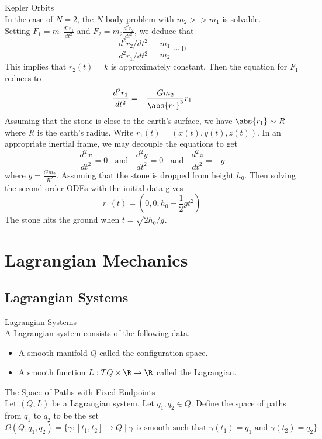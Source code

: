\documentclass[a4paper]{article}
\begin{document}
\begin{eg}{Kepler Orbits}{}\\
In the case of $N=2$, the $N$ body problem with $m_2>>m_1$ is solvable. \\

Setting $F_1=m_1\frac{d^2r_1}{dt^2}$ and $F_2=m_2\frac{d^2r_2}{dt^2}$, we deduce that $$\frac{d^2r_2/dt^2}{d^2r_1/dt^2}=\frac{m_1}{m_2}\sim 0$$ This implies that $r_2(t)=k$ is approximately constant. Then the equation for $F_1$ reduces to $$\frac{d^2r_1}{dt^2}=-\frac{Gm_2}{\abs{r_1}^3}r_1$$ Assuming that the stone is close to the earth's surface, we have $\abs{r_1}\sim R$ where $R$ is the earth's radius. Write $r_1(t)=(x(t),y(t),z(t))$. In an appropriate inertial frame, we may decouple the equations to get $$\frac{d^2x}{dt^2}=0\;\;\text{ and }\;\;\frac{d^2y}{dt^2}=0\;\;\text{ and }\;\;\frac{d^2z}{dt^2}=-g$$ where $g=\frac{Gm_2}{R^2}$. Assuming that the stone is dropped from height $h_0$. Then solving the second order ODEs with the initial data gives $$r_1(t)=\left(0,0,h_0-\frac{1}{2}gt^2\right)$$ The stone hits the ground when $t=\sqrt{2h_0/g}$. 
\end{eg}

\pagebreak
\section{Lagrangian Mechanics}
\subsection{Lagrangian Systems}
\begin{defn}{Lagrangian Systems}{}\\
A Lagrangian system consists of the following data. 
\begin{itemize}
\item A smooth manifold $Q$ called the configuration space. 
\item A smooth function $L:TQ\times\R\to\R$ called the Lagrangian. 
\end{itemize}
\end{defn}

\begin{defn}{The Space of Paths with Fixed Endpoints}{}\\
Let $(Q,L)$ be a Lagrangian system. Let $q_1,q_2\in Q$. Define the space of paths from $q_1$ to $q_2$ to be the set $$\Omega(Q,q_1,q_2)=\{\gamma:[t_1,t_2]\to Q\;|\;\gamma\text{ is smooth such that }\gamma(t_1)=q_1\text{ and }\gamma(t_2)=q_2\}$$
\end{defn}
\end{document}
